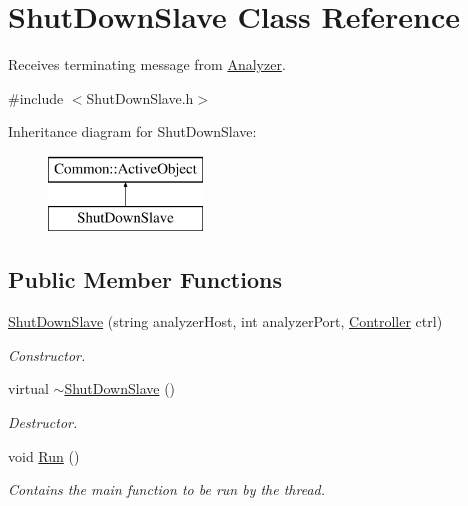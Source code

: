 \hypertarget{class_shut_down_slave}{\section{Shut\-Down\-Slave Class Reference}
\label{class_shut_down_slave}
}


Receives terminating message from \hyperlink{class_analyzer}{Analyzer}.  




{\ttfamily \#include $<$Shut\-Down\-Slave.\-h$>$}

Inheritance diagram for Shut\-Down\-Slave\-:\begin{figure}[H]
\begin{center}
\leavevmode
\includegraphics[height=2.000000cm]{class_shut_down_slave}
\end{center}
\end{figure}
\subsection*{Public Member Functions}
\begin{DoxyCompactItemize}
\item 
\hyperlink{class_shut_down_slave_a6b9ed7eb17f4c5fe5d9620ede8d3bf67}{Shut\-Down\-Slave} (string analyzer\-Host, int analyzer\-Port, \hyperlink{class_controller}{Controller} ctrl)
\begin{DoxyCompactList}\small\item\em Constructor. \end{DoxyCompactList}\item 
\hypertarget{class_shut_down_slave_a13304b7e12f219b1642c60c728994e4c}{virtual \hyperlink{class_shut_down_slave_a13304b7e12f219b1642c60c728994e4c}{$\sim$\-Shut\-Down\-Slave} ()}\label{class_shut_down_slave_a13304b7e12f219b1642c60c728994e4c}

\begin{DoxyCompactList}\small\item\em Destructor. \end{DoxyCompactList}\item 
\hypertarget{class_shut_down_slave_abbaebdf216523fcc036671281a7c71ec}{void \hyperlink{class_shut_down_slave_abbaebdf216523fcc036671281a7c71ec}{Run} ()}\label{class_shut_down_slave_abbaebdf216523fcc036671281a7c71ec}

\begin{DoxyCompactList}\small\item\em Contains the main function to be run by the thread. \end{DoxyCompactList}\end{DoxyCompactItemize}
